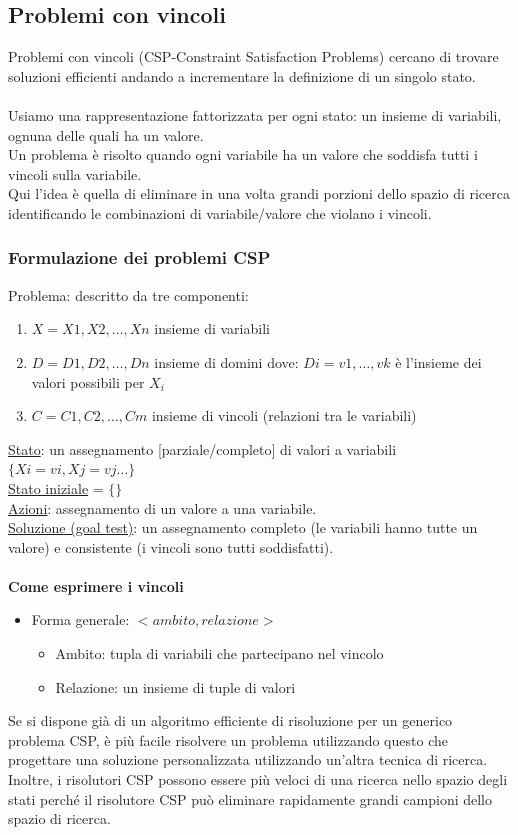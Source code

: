 \documentclass[../main.tex]{subfiles}
\begin{document}
	\subsection{Problemi con vincoli}
	Problemi con vincoli (CSP-Constraint Satisfaction Problems) cercano di trovare soluzioni efficienti andando a incrementare la definizione di un singolo stato.\\\\
	Usiamo una rappresentazione fattorizzata per ogni stato: un insieme di variabili, ognuna delle quali ha un valore.\\
	Un problema è risolto quando ogni variabile ha un valore che soddisfa tutti i vincoli sulla variabile.\\
	Qui l’idea è quella di eliminare in una volta grandi porzioni dello spazio di ricerca identificando le combinazioni di variabile/valore che violano i vincoli.
	\subsubsection{Formulazione dei problemi CSP}
	Problema: descritto da tre componenti:
	\begin{enumerate}
		\item $X={X1,X2,…,Xn}$ insieme di variabili
		\item $D={D1,D2,…,Dn}$ insieme di domini dove: $Di={v1,…,vk}$ è l’insieme dei valori possibili per $X_i$
		\item $C={C1,C2,…,Cm}$ insieme di vincoli (relazioni tra le variabili)
	\end{enumerate}
	\underline{Stato}: un assegnamento [parziale/completo] di valori a variabili $\{Xi=vi,Xj=vj…\}$\\
	\underline{Stato iniziale} = $\{\}$\\
	\underline{Azioni}: assegnamento di un valore a una variabile.\\
	\underline{Soluzione (goal test)}: un assegnamento completo (le variabili hanno tutte un valore) e consistente (i vincoli sono tutti soddisfatti).\\\\
	\textbf{Come esprimere i vincoli}
	\begin{itemize}
		\item Forma generale: $<ambito,relazione>$
		\begin{itemize}
			\item Ambito: tupla di variabili che partecipano nel vincolo
			\item Relazione: un insieme di tuple di valori
		\end{itemize}
	\end{itemize}
	Se si dispone già di un algoritmo efficiente di risoluzione per un generico problema CSP, è più facile risolvere un problema utilizzando questo che progettare una soluzione personalizzata utilizzando un’altra tecnica di ricerca.\\
	Inoltre, i risolutori CSP possono essere più veloci di una ricerca nello spazio degli stati perché il risolutore CSP può eliminare rapidamente grandi campioni dello spazio di ricerca.
\end{document}
